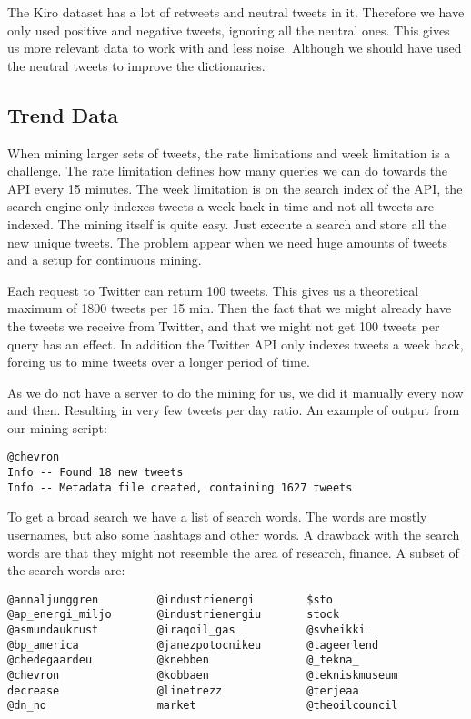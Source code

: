 The Kiro dataset has a lot of retweets and neutral tweets in it. Therefore we have
only used positive and negative tweets, ignoring all the neutral ones.
This gives us more relevant data to work with and less noise. Although we
should have used the neutral tweets to improve the dictionaries.
%

\subsection{Trend Data}\label{data:trend_data}
When mining larger sets of tweets, the rate limitations and week limitation is
a challenge. The rate limitation defines how many queries we can do towards the
API every 15 minutes. The week limitation is on the search index of the API,
the search engine only indexes tweets a week back in time and not all tweets
are indexed. The mining itself is quite easy. Just execute a search and store
all the new unique tweets. The problem appear when we need huge amounts of
tweets and a setup for continuous mining. 

Each request to Twitter can return 100 tweets. This gives us a theoretical
maximum of 1800 tweets per 15 min. Then the fact that we
might already have the tweets we receive from Twitter, and that we might not
get 100 tweets per query has an effect. In addition the Twitter API only indexes tweets a
week back, forcing us to mine tweets over a longer period of time.  

As we do not have a server to do the mining for us, we did it manually
every now and then. Resulting in very few tweets per day ratio. 
An example of output from our mining script:
\begin{verbatim}
@chevron
Info -- Found 18 new tweets
Info -- Metadata file created, containing 1627 tweets
\end{verbatim} 

To get a broad search we have a list of search words. The words are mostly
usernames, but also some hashtags and other words. A drawback with the search
words are that they might not resemble the area of research, finance.  
A subset of the search words are:
\begin{verbatim}
@annaljunggren         @industrienergi        $sto
@ap_energi_miljo       @industrienergiu       stock
@asmundaukrust         @iraqoil_gas           @svheikki
@bp_america            @janezpotocnikeu       @tageerlend
@chedegaardeu          @knebben               @_tekna_
@chevron               @kobbaen               @tekniskmuseum
decrease               @linetrezz             @terjeaa
@dn_no                 market                 @theoilcouncil
\end{verbatim}


